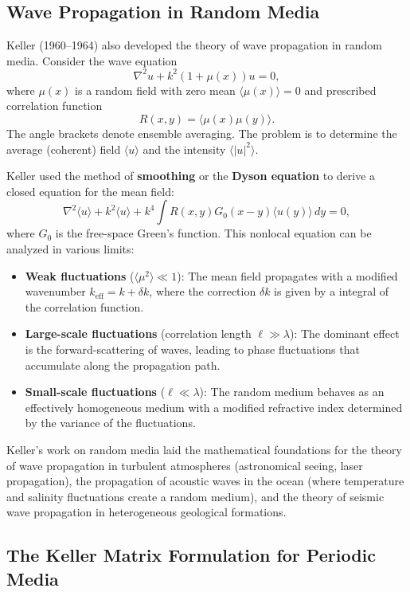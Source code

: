 \subsection{Wave Propagation in Random Media}

Keller (1960--1964) also developed the theory of wave propagation in random media. Consider the wave equation
\[
\nabla^2 u + k^2(1 + \mu(x)) u = 0,
\]
where \(\mu(x)\) is a random field with zero mean \(\langle \mu(x) \rangle = 0\) and prescribed correlation function
\[
R(x, y) = \langle \mu(x) \mu(y) \rangle.
\]
The angle brackets denote ensemble averaging. The problem is to determine the average (coherent) field \(\langle u \rangle\) and the intensity \(\langle |u|^2 \rangle\).

Keller used the method of \textbf{smoothing} or the \textbf{Dyson equation} to derive a closed equation for the mean field:
\[
\nabla^2 \langle u \rangle + k^2 \langle u \rangle + k^4 \int R(x, y) G_0(x - y) \langle u(y) \rangle\, dy = 0,
\]
where \(G_0\) is the free-space Green's function. This nonlocal equation can be analyzed in various limits:

\begin{itemize}
  \item \textbf{Weak fluctuations} (\(\langle \mu^2 \rangle \ll 1\)): The mean field propagates with a modified wavenumber \(k_{\text{eff}} = k + \delta k\), where the correction \(\delta k\) is given by a integral of the correlation function.
  \item \textbf{Large-scale fluctuations} (correlation length \(\ell \gg \lambda\)): The dominant effect is the forward-scattering of waves, leading to phase fluctuations that accumulate along the propagation path.
  \item \textbf{Small-scale fluctuations} (\(\ell \ll \lambda\)): The random medium behaves as an effectively homogeneous medium with a modified refractive index determined by the variance of the fluctuations.
\end{itemize}

Keller's work on random media laid the mathematical foundations for the theory of wave propagation in turbulent atmospheres (astronomical seeing, laser propagation), the propagation of acoustic waves in the ocean (where temperature and salinity fluctuations create a random medium), and the theory of seismic wave propagation in heterogeneous geological formations.

\subsection{The Keller Matrix Formulation for Periodic Media}

